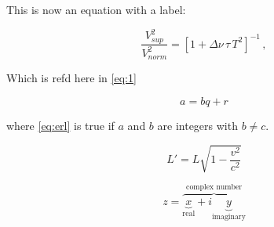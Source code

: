 This is now an equation with a label:

\begin{equation}
\label{eq:1}
\frac{V_{ sup}^2}{V_{ norm}^2} = [1 + \Delta \nu \, \tau \, T^2 ]^{-1} \, ,
\end{equation}

Which is refd here in \ref{eq:1}

\begin{equation} \label{eq:erl}
a = bq + r
\end{equation}

where \eqref{eq:erl} is true if $a$ and $b$ are integers with $b \neq c$.

\begin{equation}
  L' = {L}{\sqrt{1-\frac{v^2}{c^2}}}
 \end{equation}

\[
 z = \overbrace{
   \underbrace{x}_\text{real} + i
   \underbrace{y}_\text{imaginary}
  }^\text{complex number}
\]

